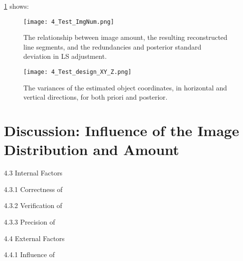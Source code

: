 \cref{fig:TestdesignHV_1} shows:


\begin{figure}
  \centering
  \texttt{[image: 4\_Test\_ImgNum.png]} %
  \caption{\small The relationship between image amount, the resulting reconstructed line segments, and the redundancies and posterior standard deviation in LS adjustment.}
  \label{fig:TestImgNum_1}
  \vspace{1cm}
  \texttt{[image: 4\_Test\_design\_XY\_Z.png]} %
  \caption{\small The variances of the estimated object coordinates, in horizontal and vertical directions, for both priori and posterior.}
  \label{fig:TestdesignHV_1}
\end{figure}


\clearpage





\section{Discussion: Influence of the Image Distribution and Amount}
\label{sec:discussion-ImageDistributionAmount}





4.3 Internal Factors

4.3.1 Correctness of

4.3.2 Verification of

4.3.3 Precision of


4.4 External Factors

4.4.1 Influence of 

